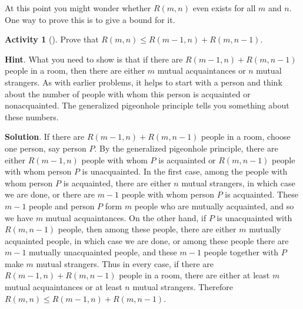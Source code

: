 \documentclass[10pt,]{book}
\theoremstyle{plain}
\theoremstyle{definition}
\theoremstyle{definition}
\theoremstyle{definition}
\newtheorem{activity}[project]{Activity}
\numberwithin{equation}{chapter}
\begin{document}
\hypertarget{p-420}{}%
At this point you might wonder whether \(R(m,n)\) even exists for all \(m\) and \(n\).  One way to prove this is to give a bound for it.%
\begin{activity}[]\label{Ramseyrecurrence}
\hypertarget{p-421}{}%
Prove that \(R(m,n)\le R(m-1,n) + R(m,n-1)\).%
\par\smallskip%
\noindent\textbf{Hint}.\hypertarget{hint-22}{}\quad%
\hypertarget{p-422}{}%
What you need to show is that if there are \(R(m - 1, n) + R(m, n - 1)\) people in a room, then there are either \(m\) mutual acquaintances or \(n\) mutual strangers. As with earlier problems, it helps to start with a person and think about the number of people with whom this person is acquainted or nonacquainted. The generalized pigeonhole principle tells you something about these numbers.%
\par\smallskip%
\noindent\textbf{Solution}.\hypertarget{solution-32}{}\quad%
\hypertarget{p-423}{}%
If there are \(R(m-1,n) +R(m,n-1)\) people in a room, choose one person, say person \(P\). By the generalized pigeonhole principle, there are either \(R(m-1,n)\) people with whom \(P\) is acquainted or \(R(m,n-1)\) people with whom person \(P\) is unacquainted. In the first case, among the people with whom person \(P\) is acquainted, there are either \(n\) mutual strangers, in which case we are done, or there are \(m-1\) people with whom person \(P\) is acquainted. These \(m-1\) people and person \(P\) form \(m\) people who are mutually acquainted, and so we have \(m\) mutual acquaintances. On the other hand, if \(P\) is unacquainted with \(R(m,n-1)\) people, then among these people, there are either \(m\) mutually acquainted people, in which case we are done, or among these people there are \(m-1\) mutually unacquainted people, and these \(m-1\) people together with \(P\) make \(m\) mutual strangers. Thus in every case, if there are \(R(m-1,n)+R(m,n-1)\) people in a room, there are either at least \(m\) mutual acquaintances or at least \(n\) mutual strangers. Therefore \(R(m,n)\le R(m-1,n)+R(m,n-1)\).%
\end{activity}
\end{document}

